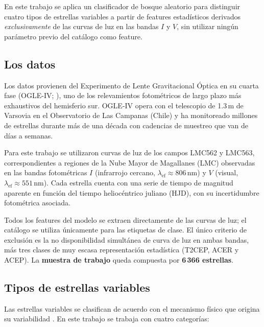\documentclass[letterpaper,12pt]{extarticle}
\begin{document}
En este trabajo se aplica un clasificador de bosque aleatorio para distinguir
cuatro tipos de estrellas variables a partir de features estadísticos derivados
\textit{exclusivamente} de las curvas de luz en las bandas $I$ y $V$, sin
utilizar ningún parámetro previo del catálogo como feature.

\subsection{Los datos}

Los datos provienen del Experimento de Lente Gravitacional Óptica en su cuarta
fase (OGLE-IV; \citealt{udalski2015}), uno de los relevamientos fotométricos de
largo plazo más exhaustivos del hemisferio sur. OGLE-IV opera con el telescopio
de 1.3\,m de Varsovia en el Observatorio de Las Campanas (Chile) y ha monitoreado
millones de estrellas durante más de una década con cadencias de muestreo que van
de días a semanas.

Para este trabajo se utilizaron curvas de luz de los campos LMC562 y LMC563,
correspondientes a regiones de la Nube Mayor de Magallanes (LMC) observadas en
las bandas fotométricas $I$ (infrarrojo cercano, $\lambda_\text{ef}\approx
806$\,nm) y $V$ (visual, $\lambda_\text{ef}\approx 551$\,nm). Cada estrella
cuenta con una serie de tiempo de magnitud aparente en función del tiempo
heliocéntrico juliano (HJD), con su incertidumbre fotométrica asociada.

Todos los features del modelo se extraen directamente de las curvas de luz; el
catálogo se utiliza únicamente para las etiquetas de clase. El único criterio de
exclusión es la no disponibilidad simultánea de curva de luz en ambas bandas, más
tres clases de muy escasa representación estadística (T2CEP, ACER y ACEP). La
\textbf{muestra de trabajo} queda compuesta por \textbf{6\,366 estrellas}.

\subsection{Tipos de estrellas variables}

Las estrellas variables se clasifican de acuerdo con el mecanismo físico que
origina su variabilidad \citep{samus2017, Karttunen2016}. En este trabajo se
trabaja con cuatro categorías:
\end{document}
